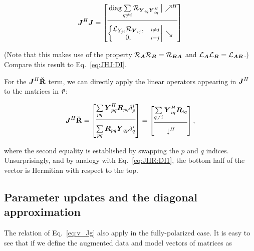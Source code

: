 \documentclass[useAMS,usenatbib]{mn2e}
\newcommand{\mat}[1]{{\bmath{#1}}}
\newcommand{\JJ}{\mat{J}} %
\newcommand{\RR}{\mat{R}}
\newcommand{\JHJ}{\JJ^H\JJ} %
\begin{document}
\begin{equation}
\label{eq:JHJ:pol}
\JHJ = \JHJblocks{
  \mathrm{diag}\sum\limits_{q\ne i} \Rop{\YY_{iq} \YY^H_{iq}} 
}{
  \left \{ 
  \begin{array}{@{}cc@{}}
   \Lop{ Y_{ji}  } \Rop{\YY_{ij}},&{\scriptstyle i\ne j} \\
   0, &{\scriptstyle i=j}
  \end{array} \right . 
}
\end{equation}

(Note that this makes use of the property $\Rop{\mat{A}}\Rop{\mat{B}}=\Rop{\mat{BA}}$ and 
$\Lop{\mat{A}}\Lop{\mat{B}}=\Lop{\mat{AB}}$.) Compare this result to Eq.~\ref{eq:JHJ:DI}.

For the $\JJ^H\RRr$ term, we can directly apply the linear operators appearing in $\JJ^H$ 
to the matrices in $\Rr$:

\begin{equation}
\JJ^H\RRr = \Matrix{c}{ 
\sum\limits_{pq} \YY^H_{pq} \RR_{pq} \delta^{i}_p  \\
\hline\\[-8pt]
\sum\limits_{pq} \RR_{pq} \YY_{qp} \delta^{i}_q 
} = \Matrix{c}{
\sum\limits_{q\ne i} \YY^H_{iq} \RR_{iq} \\
\hline\\[-8pt]
\downarrow^H
},
\end{equation}

where the second equality is established by swapping the $p$ and $q$ indices. Unsurprisingly, and by analogy with 
Eq.~\ref{eq:JHR:DI1}, the bottom half of the vector is Hermitian with respect to the top.

\subsection{Parameter updates and the diagonal approximation}

The relation of Eq.~\ref{eq:v_Jg} also apply in the fully-polarized case. It is easy to see that if we define the augmented 
data and model vectors of matrices as
\end{document}
